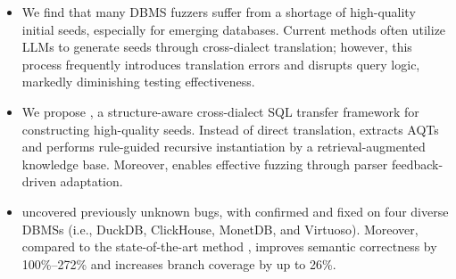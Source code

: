\documentclass[sigconf,review,anonymous]{acmart}
\begin{document}
\begin{itemize}

    \item We find that many DBMS fuzzers suffer from a shortage of high-quality initial seeds, especially for emerging databases. Current methods often utilize LLMs to generate seeds through cross-dialect translation; however, this process frequently introduces translation errors and disrupts query logic, markedly diminishing testing effectiveness.
    

    \item We propose \tool{}, a structure-aware cross-dialect SQL transfer framework for constructing high-quality seeds. Instead of direct translation, \tool{} extracts AQTs and performs rule-guided recursive instantiation by a retrieval-augmented knowledge base. Moreover, \tool{} enables effective fuzzing through parser feedback-driven adaptation.
    
    

    \item  \tool{} uncovered \bugcnt{} previously unknown bugs, with \bugconfirmcnt{} confirmed and \bugfixcnt{} fixed on four diverse DBMSs (i.e., DuckDB, ClickHouse, MonetDB, and Virtuoso). Moreover, compared to the state-of-the-art method \sedar{}, \tool{} improves semantic correctness by 100\%--272\% and increases branch coverage by up to 26\%.
\end{itemize}
\end{document}
